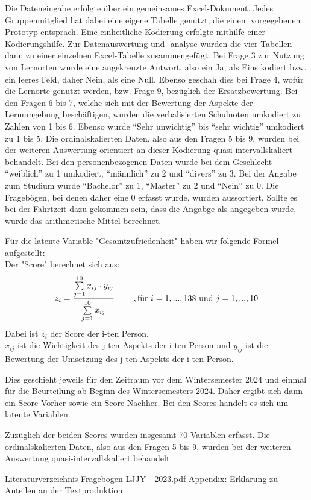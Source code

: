 \documentclass[11pt, a4paper]{article}
\begin{document}
	Die Dateneingabe erfolgte über ein gemeinsames Excel-Dokument. Jedes Gruppenmitglied hat dabei eine eigene Tabelle genutzt, die einem vorgegebenen Prototyp entsprach. Eine einheitliche Kodierung erfolgte mithilfe einer Kodierungshilfe. 
	Zur Datenauswertung und -analyse wurden die vier Tabellen dann zu einer einzelnen Excel-Tabelle zusammengefügt. 
	Bei Frage 3 zur Nutzung von Lernorten wurde eine angekreuzte Antwort, also ein Ja, als Eins kodiert bzw. ein leeres Feld, daher Nein, als eine Null. Ebenso geschah dies bei Frage 4, wofür die Lernorte genutzt werden, bzw. Frage 9, bezüglich der Ersatzbewertung.
	Bei den Fragen 6 bis 7, welche sich mit der Bewertung der Aspekte der Lernumgebung beschäftigen, wurden die verbalisierten Schulnoten umkodiert zu Zahlen von 1 bis 6. Ebenso wurde “Sehr unwichtig” bis “sehr wichtig” umkodiert zu 1 bis 5.
	Die ordinalskalierten Daten, also aus den Fragen 5 bis 9, wurden bei der weiteren Auswertung orientiert an dieser Kodierung quasi-intervallskaliert behandelt.
	Bei den personenbezogenen Daten wurde bei dem Geschlecht “weiblich” zu 1 umkodiert, “männlich” zu 2 und “divers” zu 3. 
	Bei der Angabe zum Studium wurde “Bachelor” zu 1, “Master” zu 2 und “Nein” zu 0. Die Fragebögen, bei denen daher eine 0 erfasst wurde, wurden aussortiert.
	Sollte es bei der Fahrtzeit dazu gekommen sein, dass die Angabge als  angegeben wurde, wurde das arithmetische Mittel berechnet.
	
	Für die latente Variable "Gesamtzufriedenheit" haben wir folgende Formel aufgestellt:  \\
	Der "Score" berechnet sich aus:
	\begin{equation*}
		z_i = \frac{\sum\limits_{j=1}^{10}x_{ij}\cdot  y_{ij}}{\sum\limits_{j=1}^{10}x_{ij}} \hspace{0.8cm} , \text{für} \ 
		i=1,...,138\  \text{und} \ j=1,...,10
	\end{equation*} 
	Dabei ist $z_i$ der Score der i-ten Person. \\
	$x_{ij}$ ist die Wichtigkeit des j-ten Aspekts der i-ten Person und
	$y_{ij}$ ist die Bewertung der Umsetzung des j-ten Aspekts der i-ten Person.
	
	
	Dies geschieht jeweils für den Zeitraum vor dem Wintersemester 2024 und einmal für die Beurteilung ab Beginn des Wintersemesters 2024. Daher ergibt sich dann ein Score-Vorher sowie ein Score-Nachher. Bei den Scores handelt es sich um latente Variablen.
	
	Zuzüglich der beiden Scores wurden insgesamt 70 Variablen erfasst.
	Die ordinalskalierten Daten, also aus den Fragen 5 bis 9, wurden bei der weiteren Auswertung quasi-intervallskaliert behandelt.
	
	
	\newpage Literaturverzeichnis
	\newpage 
	 {Fragebogen LJJY - 2023.pdf}
	\newpage Appendix: Erklärung zu Anteilen an der Textproduktion
	
\end{document}
